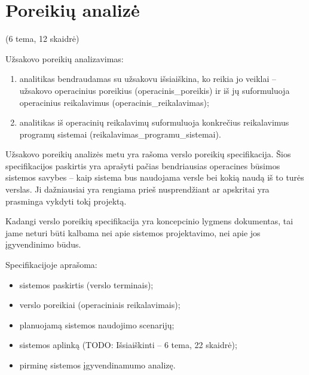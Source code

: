 
\section{Poreikių analizė}

\label{tema:poreikiu_analize}

(6 tema, 12 skaidrė)

Užsakovo poreikių analizavimas:
\begin{enumerate}
  \item analitikas bendraudamas su užsakovu išsiaiškina, ko reikia jo
    veiklai – užsakovo operacinius poreikius (\gls{operacinis_poreikis})
    ir iš jų suformuluoja operacinius reikalavimus 
    (\gls{operacinis_reikalavimas});
  \item analitikas iš operacinių reikalavimų suformuluoja konkrečius
    reikalavimus programų sistemai (\gls{reikalavimas_programu_sistemai}).
\end{enumerate}

Užsakovo poreikių analizės metu yra rašoma verslo poreikių specifikacija.
Šios specifikacijos paskirtis yra aprašyti pačias bendriausias operacines
būsimos sistemos savybes – kaip sistema bus naudojama versle bei kokią
naudą iš to turės verslas. Ji dažniausiai yra rengiama prieš nusprendžiant 
ar apskritai yra prasminga vykdyti tokį projektą.
\begin{note}
  Kadangi verslo poreikių specifikacija yra koncepcinio lygmens dokumentas,
  tai jame neturi būti kalbama nei apie sistemos projektavimo, nei apie
  jos įgyvendinimo būdus.
\end{note}

Specifikacijoje aprašoma:
\begin{itemize}
  \item sistemos paskirtis (verslo terminais);
  \item verslo poreikiai (operaciniais reikalavimais);
  \item planuojamą sistemos naudojimo scenarijų;
  \item sistemos aplinką (TODO: Išsiaiškinti – 6 tema, 22 skaidrė);
  \item pirminę sistemos įgyvendinamumo analizę.
\end{itemize}

